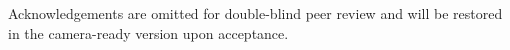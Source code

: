 \documentclass[graybox]{svmult}
\begin{document}
\begin{acknowledgement}
Acknowledgements are omitted for double-blind peer review and will be restored in the camera-ready version upon acceptance.
\end{acknowledgement}

\vspace{-0.2cm}
\let\oldbibliography\thebibliography
\renewcommand{\thebibliography}[1]{%
  \oldbibliography{#1}%
  \setlength{\itemsep}{1.2pt plus 0.2pt minus 0.2pt}%
  \setlength{\parsep}{0pt}%
}


\end{document}
